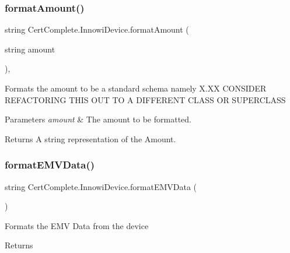 \subsubsection{\texorpdfstring{format\+Amount()}{formatAmount()}}
{\footnotesize\ttfamily string Cert\+Complete.\+Innowi\+Device.\+format\+Amount (\begin{DoxyParamCaption}\item[{string}]{amount }\end{DoxyParamCaption})\hspace{0.3cm}{\ttfamily [inline]}, {\ttfamily [private]}}



Formats the amount to be a standard schema namely X.\+XX C\+O\+N\+S\+I\+D\+ER R\+E\+F\+A\+C\+T\+O\+R\+I\+NG T\+H\+IS O\+UT TO A D\+I\+F\+F\+E\+R\+E\+NT C\+L\+A\+SS OR S\+U\+P\+E\+R\+C\+L\+A\+SS 


\begin{DoxyParams}{Parameters}
{\em amount} & The amount to be formatted.\\
\hline
\end{DoxyParams}
\begin{DoxyReturn}{Returns}
A string representation of the Amount.
\end{DoxyReturn}
\mbox{\label{class_cert_complete_1_1_innowi_device_aad620bfcbd0417cc415585372baa8112}} 
\subsubsection{\texorpdfstring{format\+E\+M\+V\+Data()}{formatEMVData()}}
{\footnotesize\ttfamily string Cert\+Complete.\+Innowi\+Device.\+format\+E\+M\+V\+Data (\begin{DoxyParamCaption}{ }\end{DoxyParamCaption})\hspace{0.3cm}{\ttfamily [inline]}}



Formats the E\+MV Data from the device 

\begin{DoxyReturn}{Returns}

\end{DoxyReturn}
\mbox{\label{class_cert_complete_1_1_innowi_device_a9db23bf8f2599eea59d391bcad2b8193}} 
